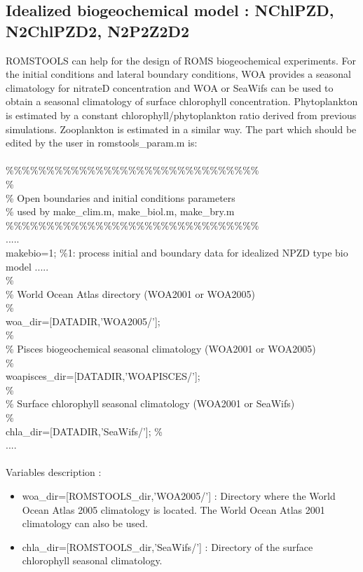 \subsection{Idealized biogeochemical model : NChlPZD, N2ChlPZD2, N2P2Z2D2}
ROMSTOOLS can help for the design of ROMS biogeochemical
experiments. For the initial conditions and lateral boundary
conditions, WOA provides a seasonal climatology for nitrateD
concentration and WOA or SeaWifs can be used to obtain a 
seasonal climatology of surface chlorophyll concentration.
Phytoplankton is estimated by a constant chlorophyll/phytoplankton 
ratio derived from previous simulations. Zooplankton is estimated
in a similar way. The part which should be edited by the user in 
romstools\_param.m is:\\
\\ 
\%\%\%\%\%\%\%\%\%\%\%\%\%\%\%\%\%\%\%\%\%\%\%\%\%\%\%\%\%\%\%\\
\%\\
\% Open boundaries and initial conditions parameters\\
\%   used by make\_clim.m, make\_biol.m, make\_bry.m\\
\%\%\%\%\%\%\%\%\%\%\%\%\%\%\%\%\%\%\%\%\%\%\%\%\%\%\%\%\%\%\%\\
..... \\
makebio=1;    \%1: process initial and boundary data for idealized NPZD type bio model
..... \\
\noindent \% \\
\% World Ocean Atlas directory (WOA2001 or WOA2005)  \\
\% \\
woa\_dir=[DATADIR,'WOA2005/'];  \\
\% \\
\% Pisces biogeochemical seasonal climatology (WOA2001 or WOA2005)  \\
\% \\
woapisces\_dir=[DATADIR,'WOAPISCES/']; \\
\%\\
\% Surface chlorophyll seasonal climatology (WOA2001 or SeaWifs) \\
\%\\
chla\_dir=[DATADIR,'SeaWifs/'];
\% \\
.... \\ \\
Variables description :
\begin{itemize}
\item woa\_dir=[ROMSTOOLS\_dir,'WOA2005/'] : Directory where the World Ocean
Atlas 2005 climatology \citep{Con02} is located. The World Ocean
Atlas 2001 climatology can also be used.
\item chla\_dir=[ROMSTOOLS\_dir,'SeaWifs/'] : Directory of the surface 
chlorophyll seasonal climatology.
\end{itemize}


